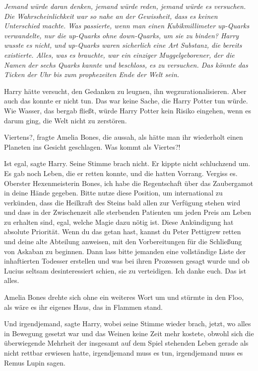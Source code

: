 \emph{Jemand würde daran denken, jemand würde reden, jemand würde es versuchen.
Die Wahrscheinlichkeit war so nahe an der Gewissheit, dass es keinen Unterschied
machte. Was passierte, wenn man einen Kubikmillimeter up-Quarks verwandelte, nur
die up-Quarks ohne down-Quarks, um sie zu binden? Harry wusste es nicht, und
up-Quarks waren sicherlich eine Art Substanz, die bereits existierte. Alles, was
es brauchte, war ein einziger Muggelgeborener, der die Namen der sechs Quarks
kannte und beschloss, es zu versuchen. Das könnte das Ticken der Uhr bis zum
prophezeiten Ende der Welt sein.}

Harry hätte versucht, den Gedanken zu leugnen, ihn wegzurationalisieren. Aber
auch das konnte er nicht tun. Das war keine Sache, die Harry Potter tun würde.
Wie Wasser, das bergab fließt, würde Harry Potter kein Risiko eingehen, wenn es
darum ging, die Welt nicht zu zerstören.

\glqq{}Viertens?\grqq{}, fragte Amelia Bones, die aussah, als hätte man ihr
wiederholt einen Planeten ins Gesicht geschlagen. \glqq{}Was kommt als Viertes?!\grqq{}

\glqq{}Ist egal\grqq{}, sagte Harry. Seine Stimme brach nicht. Er kippte nicht
schluchzend um. Es gab noch Leben, die er retten konnte, und die hatten Vorrang.
\glqq{}Vergiss es. Oberster Hexenmeisterin Bones, ich habe die Regentschaft über
das Zaubergamot in deine Hände gegeben. Bitte nutze diese Position, um
international zu verkünden, dass die Heilkraft des Steins bald allen zur
Verfügung stehen wird und dass in der Zwischenzeit alle sterbenden Patienten um
jeden Preis am Leben zu erhalten sind, egal, welche Magie dazu nötig ist. Diese
Ankündigung hat absolute Priorität. Wenn du das getan hast, kannst du Peter
Pettigrew retten und deine alte Abteilung anweisen, mit den Vorbereitungen für
die Schließung von Askaban zu beginnen. Dann lass bitte jemanden eine
vollständige Liste der inhaftierten Todesser erstellen und was bei ihren
Prozessen gesagt wurde und ob Lucius seltsam desinteressiert schien, sie zu
verteidigen. Ich danke euch. Das ist alles.\grqq{}

Amelia Bones drehte sich ohne ein weiteres Wort um und stürmte in den Floo, als
wäre es ihr eigenes Haus, das in Flammen stand.

\glqq{}Und irgendjemand\grqq{}, sagte Harry, wobei seine Stimme wieder brach,
jetzt, wo alles in Bewegung gesetzt war und das Weinen keine Zeit mehr kostete,
obwohl sich die überwiegende Mehrheit der insgesamt auf dem Spiel stehenden
Leben gerade als nicht rettbar erwiesen hatte, \glqq{}irgendjemand muss es tun,
irgendjemand muss es Remus Lupin sagen.\grqq{}

